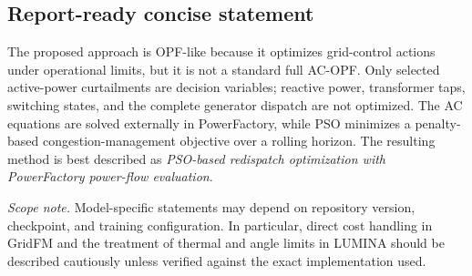 \documentclass[11pt,a4paper]{article}
\begin{document}
\subsection*{Report-ready concise statement}

The proposed approach is OPF-like because it optimizes grid-control actions under operational limits, but it is not a standard full AC-OPF. Only selected active-power curtailments are decision variables; reactive power, transformer taps, switching states, and the complete generator dispatch are not optimized. The AC equations are solved externally in PowerFactory, while PSO minimizes a penalty-based congestion-management objective over a rolling horizon. The resulting method is best described as \emph{PSO-based redispatch optimization with PowerFactory power-flow evaluation}.

\vfill
{\footnotesize\color{darkgray}\textit{Scope note.} Model-specific statements may depend on repository version, checkpoint, and training configuration. In particular, direct cost handling in GridFM and the treatment of thermal and angle limits in LUMINA should be described cautiously unless verified against the exact implementation used.}
\end{document}
